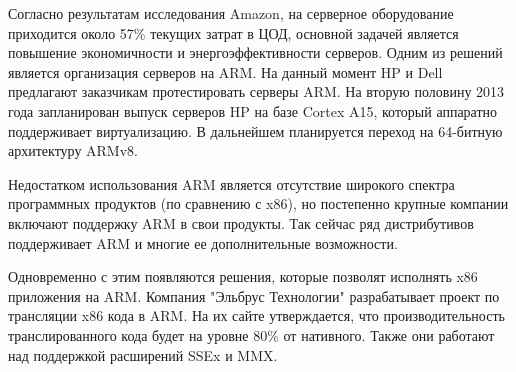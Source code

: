 Согласно результатам исследования Amazon, на серверное оборудование приходится около 57\% текущих затрат в ЦОД, основной задачей является повышение экономичности и энергоэффективности серверов\cite{lan_magazine}. Одним из решений является организация серверов на ARM. На данный момент HP и Dell предлагают заказчикам протестировать серверы ARM. На вторую половину 2013 года запланирован выпуск серверов HP на базе Cortex A15, который аппаратно поддерживает виртуализацию. В дальнейшем планируется переход на 64-битную архитектуру ARMv8. 

Недостатком использования ARM является отсутствие широкого спектра программных продуктов (по сравнению с x86), но постепенно крупные компании включают поддержку ARM в свои продукты. Так сейчас ряд дистрибутивов поддерживает ARM и многие ее дополнительные возможности.

Одновременно с этим появляются решения, которые позволят исполнять x86 приложения на ARM. Компания "Эльбрус Технологии" разрабатывает проект по трансляции x86 кода в ARM. На их сайте утверждается, что производительность транслированного кода будет на уровне 80\% от нативного\cite{site_elbrus}. Также они работают над поддержкой расширений SSEx и MMX. 